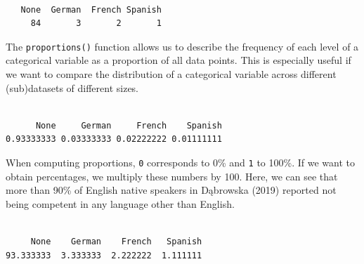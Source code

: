 \documentclass[
  letterpaper,
  DIV=11,
  numbers=noendperiod]{scrreprt}
\newenvironment{Shaded}{\begin{snugshade}}{\end{snugshade}}
\newcommand{\AttributeTok}[1]{\textcolor[rgb]{0.40,0.45,0.13}{#1}}
\newcommand{\ConstantTok}[1]{\textcolor[rgb]{0.56,0.35,0.01}{#1}}
\newcommand{\DecValTok}[1]{\textcolor[rgb]{0.68,0.00,0.00}{#1}}
\newcommand{\FunctionTok}[1]{\textcolor[rgb]{0.28,0.35,0.67}{#1}}
\newcommand{\NormalTok}[1]{\textcolor[rgb]{0.00,0.23,0.31}{#1}}
\newcommand{\OtherTok}[1]{\textcolor[rgb]{0.00,0.23,0.31}{#1}}
\newcommand{\SpecialCharTok}[1]{\textcolor[rgb]{0.37,0.37,0.37}{#1}}
\begin{document}
\begin{verbatim}

   None  German  French Spanish 
     84       3       2       1 
\end{verbatim}

The \texttt{proportions()} function allows us to describe the frequency
of each level of a categorical variable as a proportion of all data
points. This is especially useful if we want to compare the distribution
of a categorical variable across different (sub)datasets of different
sizes.

\begin{Shaded}
\end{Shaded}

\begin{verbatim}

      None     German     French    Spanish 
0.93333333 0.03333333 0.02222222 0.01111111 
\end{verbatim}

When computing proportions, \texttt{0} corresponds to 0\% and \texttt{1}
to 100\%. If we want to obtain percentages, we multiply these numbers by
100. Here, we can see that more than 90\% of English native speakers in
Dąbrowska (2019) reported not being competent in any language other than
English.

\begin{Shaded}
\end{Shaded}

\begin{verbatim}

     None    German    French   Spanish 
93.333333  3.333333  2.222222  1.111111 
\end{verbatim}
\end{document}
